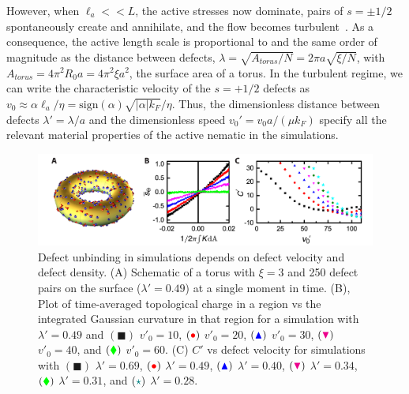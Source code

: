 However, when $\ell_a << L$, the active stresses now dominate, pairs of $s = \pm 1/2$ spontaneously create and annihilate, and the flow becomes turbulent~\cite{RN7}.
As a consequence, the active length scale is proportional to and the same order of magnitude as the distance between defects, $\lambda = \sqrt{A_{torus}/N} = 2 \pi a \sqrt{\xi/N}$, with $A_{torus} = 4 \pi^2 R_0 a = 4 \pi^2 \xi a^2$, the surface area of a torus.
In the turbulent regime, we can write the characteristic velocity of the $s = +1/2$ defects as $v_0 \approx \alpha \ell_a/ \eta = \textrm{sign}(\alpha) \sqrt{|\alpha| k_F}/\eta$.
Thus, the dimensionless distance between defects $\lambda' = \lambda/a$ and the dimensionless speed $v_0' = v_0 a /(\mu k_F)$ specify all the relevant material properties of the active nematic in the simulations.
\begin{figure}
  \centering
  \includegraphics{figures/C3/Ch3-Figs_SimDefectUnbinding.png}
  \caption{Defect unbinding in simulations depends on defect velocity and defect density.
  (A) Schematic of a torus with $\xi = 3$ and 250 defect pairs on the surface ($\lambda' = 0.49$) at a single moment in time.
  (B), Plot of time-averaged topological charge in a region vs the integrated Gaussian curvature  in that region for a simulation with $\lambda' = 0.49$ and
  $({\blacksquare})$ $v'_0 = 10$,
  $({\color{red} \bullet})$ $v'_0 = 20$,
  $({\color{blue} \blacktriangle})$ $v'_0 = 30$,
  $({\color{magenta} \blacktriangledown})$ $v'_0 = 40$, and
  $({\color{green} \blacklozenge})$ $v'_0 = 60$.
  (C) $C'$ vs defect velocity for simulations with
  $({\blacksquare})$ $\lambda' = 0.69$,
  $({\color{red} \bullet})$ $\lambda' = 0.49$,
  $({\color{blue} \blacktriangle})$ $\lambda' = 0.40$,
  $({\color{magenta} \blacktriangledown})$ $\lambda' = 0.34$,
  $({\color{green} \blacklozenge})$ $\lambda' = 0.31$, and
  $({\color{teal} \star})$ $\lambda' = 0.28$.}\label{f:3-SimDefectUnbinding}
\end{figure}

